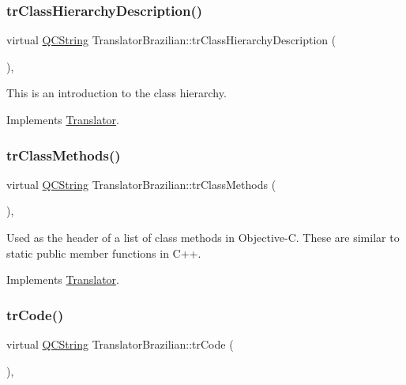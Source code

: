 \subsubsection{\texorpdfstring{trClassHierarchyDescription()}{trClassHierarchyDescription()}}
{\footnotesize\ttfamily virtual \mbox{\hyperlink{class_q_c_string}{Q\+C\+String}} Translator\+Brazilian\+::tr\+Class\+Hierarchy\+Description (\begin{DoxyParamCaption}{ }\end{DoxyParamCaption})\hspace{0.3cm}{\ttfamily [inline]}, {\ttfamily [virtual]}}

This is an introduction to the class hierarchy. 

Implements \mbox{\hyperlink{class_translator}{Translator}}.

\mbox{\label{class_translator_brazilian_a4b6f43de2a7df631605e4739146b6086}} 
\subsubsection{\texorpdfstring{trClassMethods()}{trClassMethods()}}
{\footnotesize\ttfamily virtual \mbox{\hyperlink{class_q_c_string}{Q\+C\+String}} Translator\+Brazilian\+::tr\+Class\+Methods (\begin{DoxyParamCaption}{ }\end{DoxyParamCaption})\hspace{0.3cm}{\ttfamily [inline]}, {\ttfamily [virtual]}}

Used as the header of a list of class methods in Objective-\/C. These are similar to static public member functions in C++. 

Implements \mbox{\hyperlink{class_translator}{Translator}}.

\mbox{\label{class_translator_brazilian_ae961c42bbf858517618be23bea083525}} 
\subsubsection{\texorpdfstring{trCode()}{trCode()}}
{\footnotesize\ttfamily virtual \mbox{\hyperlink{class_q_c_string}{Q\+C\+String}} Translator\+Brazilian\+::tr\+Code (\begin{DoxyParamCaption}{ }\end{DoxyParamCaption})\hspace{0.3cm}{\ttfamily [inline]}, {\ttfamily [virtual]}}

